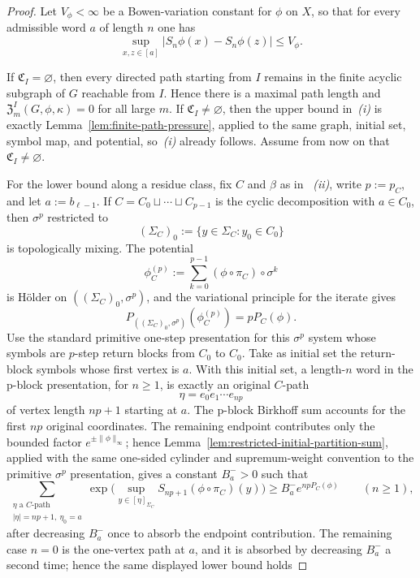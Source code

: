 \documentclass{etds}%
\numberwithin{equation}{section}
\theoremstyle{plain}
\theoremstyle{definition}
\theoremstyle{remark}
\begin{document}
\begin{proof}
Let $V_\phi<\infty$ be a Bowen-variation constant for $\phi$ on $X$, so that
for every admissible word $a$ of length $n$ one has
\[
\sup_{x,z\in[a]}|S_n\phi(x)-S_n\phi(z)|\le V_\phi.
\]

If $\mathfrak{C}_I=\varnothing$, then every directed path starting from $I$
remains in the finite acyclic subgraph of $G$ reachable from $I$.  Hence there
is a maximal path length and
$\mathfrak{Z}_m^I(G,\phi,\kappa)=0$ for all large $m$.
If $\mathfrak{C}_I\neq\varnothing$, then the upper bound in~\emph{(i)} is
exactly Lemma~\ref{lem:finite-path-pressure}, applied to the same graph,
initial set, symbol map, and potential, so~\emph{(i)} already follows.
Assume from now on that $\mathfrak{C}_I\neq\varnothing$.

For the lower bound along a residue class, fix $C$ and $\beta$ as in
~\emph{(ii)}, write $p:=p_C$, and let $a:=b_{\ell-1}$.  If
$C=C_0\sqcup\cdots\sqcup C_{p-1}$ is the cyclic decomposition with
$a\in C_0$, then $\sigma^p$ restricted to
\[
(\Sigma_C)_0:=\{y\in\Sigma_C:y_0\in C_0\}
\]
is topologically mixing.  The potential
\[
\phi_C^{(p)}
:=\sum_{k=0}^{p-1}(\phi\circ\pi_C)\circ\sigma^k
\]
is H\"older on $((\Sigma_C)_0,\sigma^p)$, and the variational principle for the
iterate gives
\[
P_{((\Sigma_C)_0,\sigma^p)}(\phi_C^{(p)})=pP_C(\phi).
\]
Use the standard primitive one-step presentation for this $\sigma^p$ system
whose symbols are $p$-step return blocks from $C_0$ to $C_0$.  Take as initial
set the return-block symbols whose first vertex is $a$.  With this initial set,
a length-$n$ word in the p-block presentation, for $n\ge1$, is exactly an
original $C$-path
\[
\eta=e_0e_1\cdots e_{np}
\]
of vertex length $np+1$ starting at $a$.  The p-block Birkhoff sum accounts for
the first $np$ original coordinates.  The remaining endpoint contributes only
the bounded factor $e^{\pm\|\phi\|_\infty}$; hence
Lemma~\ref{lem:restricted-initial-partition-sum}, applied with the same
one-sided cylinder and supremum-weight convention to the primitive
$\sigma^p$ presentation, gives a constant $B_a^->0$ such that
\[
\sum_{\substack{\eta\text{ a }C\text{-path}\\ |\eta|=np+1,\ \eta_0=a}}
\exp\!\bigl(\sup_{y\in[\eta]_{\Sigma_C}}S_{np+1}(\phi\circ\pi_C)(y)\bigr)
\ge B_a^-e^{npP_C(\phi)}
\qquad(n\ge 1),
\]
after decreasing $B_a^-$ once to absorb the endpoint contribution.  The
remaining case $n=0$ is the one-vertex path at $a$, and it is absorbed by
decreasing $B_a^-$ a second time; hence the same displayed lower bound holds

\end{proof}
\end{document}
